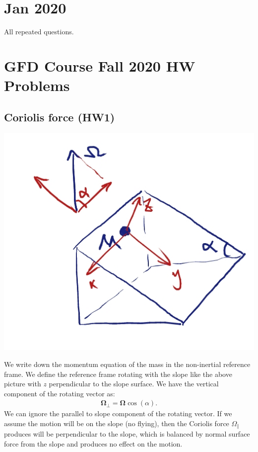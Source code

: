 \documentclass[11pt,letterpaper]{book}
\theoremstyle{definition}
\newcommand{\ve}[1]{\boldsymbol{#1}}
\begin{document}
\chapter{Jan 2020}
All repeated questions.


\chapter{GFD Course Fall 2020 HW Problems}
\section{Coriolis force (HW1)}
\begin{center}
\includegraphics[scale=0.45]{Fig/slope}
\end{center}
We write down the momentum equation of the mass in the non-inertial reference frame. We define the reference frame rotating with the slope like the above picture with $z$ perpendicular to the slope surface. We have the vertical component of the rotating vector as:
\begin{align*}
\ve\Omega_\perp = \ve\Omega\cos(\alpha).
\end{align*}
We can ignore the parallel to slope component of the rotating vector. If we assume the motion will be on the slope (no flying), then the Coriolis force $\Omega_\parallel$ produces will be perpendicular to the slope, which is balanced by normal surface force from the slope and produces no effect on the motion. 
\end{document}
